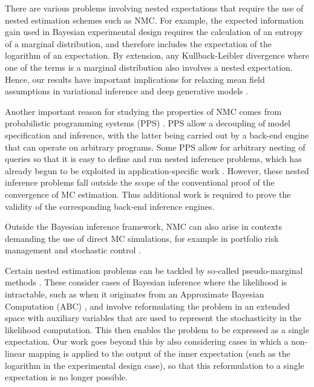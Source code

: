 There are various problems involving nested expectations that require the use of nested
estimation schemes such as NMC. For example, the expected information gain used in
Bayesian experimental design \citep{chaloner1995bayesian,sebastiani2000maximum} requires
the calculation of an entropy of a marginal distribution, and therefore includes the
expectation of the logarithm of an expectation.  By extension, any Kullback-Leibler
divergence where one of the terms is a marginal distribution also involves a nested expectation.  Hence, our results have important implications for relaxing mean field assumptions in variational
inference \citep{hoffman2015stochastic} and deep generative models
\citep{burda2015importance,maaloe2016auxiliary}.

Another important reason for studying the properties of NMC comes from
probabilistic programming systems (PPS)
\citep{goodman2008church,wood2014new}.
PPS allow a decoupling of model specification and inference, with the latter being carried out
by a back-end engine that can operate on arbitrary programs. Some PPS allow for
arbitrary nesting of queries so that it is easy to define and run nested inference
problems, which has already begun to be exploited in application-specific work
\citep{ouyang2016practical}. However, these nested inference problems fall outside the
scope of the conventional proof of the convergence of MC estimation. Thus additional
work is required to prove the validity of the corresponding back-end inference engines.

Outside the Bayesian inference framework, NMC can also arise in contexts demanding the use
of direct MC simulations, for example in portfolio risk management
\citep{gordy2010nested} and stochastic control \citep{belomestny2010regression}. 

Certain nested estimation problems can be tackled by so-called pseudo-marginal methods
\citep{andrieu2009pseudo,andrieu2010particle,andrieu2015convergence,andersson2015nested}.
These consider cases of Bayesian inference where the likelihood is intractable, such as
when it originates from an Approximate Bayesian Computation (ABC)
\citep{csillery2010approximate},
and involve reformulating the problem in an extended space with auxiliary variables that
are used to represent the stochasticity in the likelihood computation. This then enables the
problem to be expressed as a single expectation.
Our work goes beyond this by also considering cases in which a non-linear mapping is
applied to the output of the inner expectation (such as the logarithm in the 
experimental design case), so that this reformulation to a single expectation is no longer
possible.

